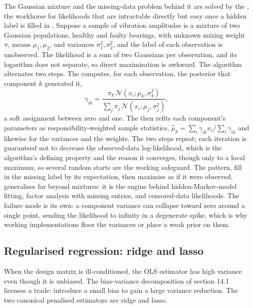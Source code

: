 \begin{mastery}
The Gaussian mixture and the missing-data problem behind it are
solved by the , the
workhorse for likelihoods that are intractable directly but easy once
a hidden label is filled in
\cite[ch.~8]{text:hastie-tibshirani-friedman}. Suppose a sample of
vibration amplitudes is a mixture of two Gaussian populations,
healthy and faulty bearings, with unknown mixing weight $\pi$, means
$\mu_{1}, \mu_{2}$, and variances $\sigma_{1}^{2}, \sigma_{2}^{2}$,
and the label of each observation is unobserved. The likelihood is a
sum of two Gaussians per observation, and its logarithm does not
separate, so direct maximisation is awkward. The algorithm alternates
two steps. The  computes, for each observation, the
posterior  that component $k$ generated it,
\[
\gamma_{ik} = \frac{\pi_{k}\, \mathcal{N}(x_{i}; \mu_{k},
\sigma_{k}^{2})}{\sum_{j}\pi_{j}\,\mathcal{N}(x_{i}; \mu_{j},
\sigma_{j}^{2})},
\]
a soft assignment between zero and one. The  then
refits each component's parameters as responsibility-weighted sample
statistics, $\hat{\mu}_{k} = \sum_{i}\gamma_{ik}x_{i}/\sum_{i}
\gamma_{ik}$ and likewise for the variances and the weights. The two
steps repeat; each iteration is guaranteed not to decrease the
observed-data log-likelihood, which is the algorithm's defining
property and the reason it converges, though only to a local maximum,
so several random starts are the working safeguard. The pattern, fill
in the missing label by its expectation, then maximise as if it were
observed, generalises far beyond mixtures: it is the engine behind
hidden-Markov-model fitting, factor analysis with missing entries, and
censored-data likelihoods. The failure mode is its own: a component
variance can collapse toward zero around a single point, sending the
likelihood to infinity in a degenerate spike, which is why working
implementations floor the variances or place a weak prior on them.
\end{mastery}

\subsection{Regularised regression: ridge and lasso}

When the design matrix is ill-conditioned, the OLS estimator has
high variance even though it is unbiased. The bias-variance
decomposition of section 14.1 licenses a trade: introduce a small
bias to gain a large variance reduction. The two canonical
penalised estimators are ridge and lasso.

